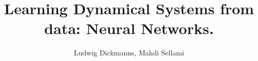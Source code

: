 \usepackage[utf8]{inputenc}
\usepackage{packages}
\usepackage{beamermods}

\usepackage{tikz}
\usepackage{pgfplots}
\usepackage{url}
\usepackage{algorithm2e}
\usepackage{svg}
\usepackage{amsmath}


\author[L. Dickmanns, M. Sellami]{Ludwig Dickmanns, Mahdi Sellami}
\title[Learning Dynamical Systems with NNs]{Learning Dynamical Systems from data: Neural Networks.}



\date{}


\usepackage{pgfpages}
\usepackage{ifthen}
\newif\ifsolution%

\makeatletter
\let\@@magyar@captionfix\relax
\makeatother
